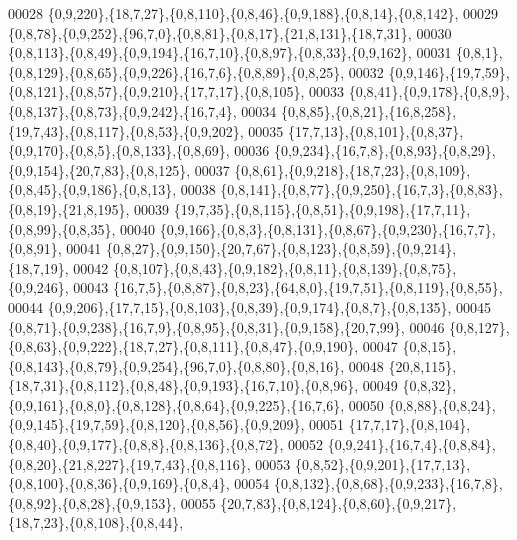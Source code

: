 \begin{DoxyCode}
00028         \{0,9,220\},\{18,7,27\},\{0,8,110\},\{0,8,46\},\{0,9,188\},\{0,8,14\},\{0,8,142\},
00029         \{0,8,78\},\{0,9,252\},\{96,7,0\},\{0,8,81\},\{0,8,17\},\{21,8,131\},\{18,7,31\},
00030         \{0,8,113\},\{0,8,49\},\{0,9,194\},\{16,7,10\},\{0,8,97\},\{0,8,33\},\{0,9,162\},
00031         \{0,8,1\},\{0,8,129\},\{0,8,65\},\{0,9,226\},\{16,7,6\},\{0,8,89\},\{0,8,25\},
00032         \{0,9,146\},\{19,7,59\},\{0,8,121\},\{0,8,57\},\{0,9,210\},\{17,7,17\},\{0,8,105\},
00033         \{0,8,41\},\{0,9,178\},\{0,8,9\},\{0,8,137\},\{0,8,73\},\{0,9,242\},\{16,7,4\},
00034         \{0,8,85\},\{0,8,21\},\{16,8,258\},\{19,7,43\},\{0,8,117\},\{0,8,53\},\{0,9,202\},
00035         \{17,7,13\},\{0,8,101\},\{0,8,37\},\{0,9,170\},\{0,8,5\},\{0,8,133\},\{0,8,69\},
00036         \{0,9,234\},\{16,7,8\},\{0,8,93\},\{0,8,29\},\{0,9,154\},\{20,7,83\},\{0,8,125\},
00037         \{0,8,61\},\{0,9,218\},\{18,7,23\},\{0,8,109\},\{0,8,45\},\{0,9,186\},\{0,8,13\},
00038         \{0,8,141\},\{0,8,77\},\{0,9,250\},\{16,7,3\},\{0,8,83\},\{0,8,19\},\{21,8,195\},
00039         \{19,7,35\},\{0,8,115\},\{0,8,51\},\{0,9,198\},\{17,7,11\},\{0,8,99\},\{0,8,35\},
00040         \{0,9,166\},\{0,8,3\},\{0,8,131\},\{0,8,67\},\{0,9,230\},\{16,7,7\},\{0,8,91\},
00041         \{0,8,27\},\{0,9,150\},\{20,7,67\},\{0,8,123\},\{0,8,59\},\{0,9,214\},\{18,7,19\},
00042         \{0,8,107\},\{0,8,43\},\{0,9,182\},\{0,8,11\},\{0,8,139\},\{0,8,75\},\{0,9,246\},
00043         \{16,7,5\},\{0,8,87\},\{0,8,23\},\{64,8,0\},\{19,7,51\},\{0,8,119\},\{0,8,55\},
00044         \{0,9,206\},\{17,7,15\},\{0,8,103\},\{0,8,39\},\{0,9,174\},\{0,8,7\},\{0,8,135\},
00045         \{0,8,71\},\{0,9,238\},\{16,7,9\},\{0,8,95\},\{0,8,31\},\{0,9,158\},\{20,7,99\},
00046         \{0,8,127\},\{0,8,63\},\{0,9,222\},\{18,7,27\},\{0,8,111\},\{0,8,47\},\{0,9,190\},
00047         \{0,8,15\},\{0,8,143\},\{0,8,79\},\{0,9,254\},\{96,7,0\},\{0,8,80\},\{0,8,16\},
00048         \{20,8,115\},\{18,7,31\},\{0,8,112\},\{0,8,48\},\{0,9,193\},\{16,7,10\},\{0,8,96\},
00049         \{0,8,32\},\{0,9,161\},\{0,8,0\},\{0,8,128\},\{0,8,64\},\{0,9,225\},\{16,7,6\},
00050         \{0,8,88\},\{0,8,24\},\{0,9,145\},\{19,7,59\},\{0,8,120\},\{0,8,56\},\{0,9,209\},
00051         \{17,7,17\},\{0,8,104\},\{0,8,40\},\{0,9,177\},\{0,8,8\},\{0,8,136\},\{0,8,72\},
00052         \{0,9,241\},\{16,7,4\},\{0,8,84\},\{0,8,20\},\{21,8,227\},\{19,7,43\},\{0,8,116\},
00053         \{0,8,52\},\{0,9,201\},\{17,7,13\},\{0,8,100\},\{0,8,36\},\{0,9,169\},\{0,8,4\},
00054         \{0,8,132\},\{0,8,68\},\{0,9,233\},\{16,7,8\},\{0,8,92\},\{0,8,28\},\{0,9,153\},
00055         \{20,7,83\},\{0,8,124\},\{0,8,60\},\{0,9,217\},\{18,7,23\},\{0,8,108\},\{0,8,44\},

\end{DoxyCode}
